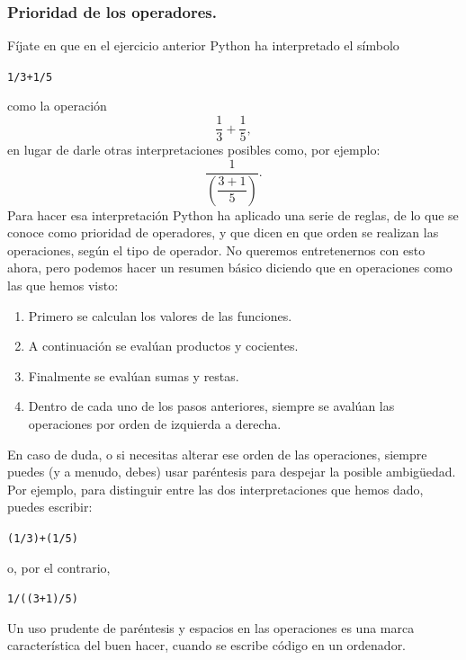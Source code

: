\documentclass[10pt,a4paper]{article}\usepackage[]{graphicx}\usepackage[]{color}
\makeatletter
\newcommand{\hlnum}[1]{\textcolor[rgb]{0.686,0.059,0.569}{#1}}%
\newcommand{\hlopt}[1]{\textcolor[rgb]{0,0,0}{#1}}%
\newcommand{\hlstd}[1]{\textcolor[rgb]{0.345,0.345,0.345}{#1}}%
\newenvironment{kframe}{%
 \def\at@end@of@kframe{}%
 \ifinner\ifhmode%
  \def\at@end@of@kframe{\end{minipage}}%
  \begin{minipage}{\columnwidth}%
 \fi\fi%
 \def\FrameCommand##1{\hskip\@totalleftmargin \hskip-\fboxsep
 \colorbox{shadecolor}{##1}\hskip-\fboxsep
     \hskip-\linewidth \hskip-\@totalleftmargin \hskip\columnwidth}%
 \MakeFramed {\advance\hsize-\width
   \@totalleftmargin\z@ \linewidth\hsize
   \@setminipage}}%
 {\par\unskip\endMakeFramed%
 \at@end@of@kframe}
\newenvironment{knitrout}{}{} %
\newcounter {cont01}
\makeatother
\begin{document}
\subsubsection*{Prioridad de los operadores.}


Fíjate en que en el ejercicio anterior Python ha interpretado el símbolo
\begin{knitrout}
\color{fgcolor}\begin{kframe}
\begin{alltt}
\hlnum{1} \hlopt{/} \hlnum{3} \hlopt{+} \hlnum{1} \hlopt{/} \hlnum{5}
\end{alltt}
\end{kframe}
\end{knitrout}
como la operación
\[\dfrac{1}{3} + \dfrac{1}{5},\]
en lugar de darle otras interpretaciones posibles como, por ejemplo:
\[\dfrac{1}{\left(\dfrac{3 + 1}{5}\right)}.\]
Para hacer esa interpretación Python ha aplicado una serie de reglas, de lo que se conoce como {\sf prioridad de operadores}, y que dicen en que orden se realizan las operaciones, según el tipo de operador. No queremos entretenernos con esto ahora, pero podemos hacer un resumen básico diciendo que en operaciones como las que hemos visto:
\begin{enumerate}
\item Primero se calculan los valores de las funciones.
\item A continuación se evalúan productos y cocientes.
\item Finalmente se evalúan sumas y restas.
\item Dentro de cada uno de los pasos anteriores, siempre se avalúan las operaciones  por orden de izquierda a derecha.
\end{enumerate}
En caso de duda, o si necesitas alterar ese orden de las operaciones, siempre puedes (y a menudo, debes) usar paréntesis para despejar la posible ambigüedad. Por ejemplo, para distinguir entre las dos interpretaciones que hemos dado, puedes escribir:
\begin{knitrout}
\color{fgcolor}\begin{kframe}
\begin{alltt}
\hlstd{(}\hlnum{1} \hlopt{/} \hlnum{3}\hlstd{)} \hlopt{+} \hlstd{(}\hlnum{1} \hlopt{/} \hlnum{5}\hlstd{)}
\end{alltt}
\end{kframe}
\end{knitrout}
o, por el contrario,
\begin{knitrout}
\color{fgcolor}\begin{kframe}
\begin{alltt}
\hlnum{1} \hlopt{/} \hlstd{((}\hlnum{3}\hlopt{+}\hlnum{1}\hlstd{)} \hlopt{/} \hlnum{5}\hlstd{)}
\end{alltt}
\end{kframe}
\end{knitrout}
Un uso prudente de paréntesis y espacios en las operaciones es una marca característica del buen hacer, cuando se escribe código en un ordenador.
\end{document}
